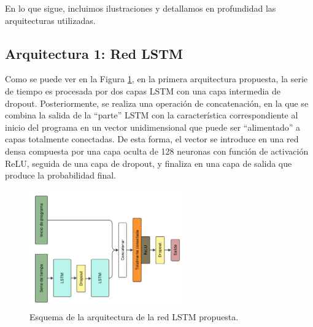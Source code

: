 \documentclass[../../main.tex]{subfiles}
\begin{document}
En lo que sigue, incluimos ilustraciones y detallamos en profundidad las arquitecturas
utilizadas.

\subsection{Arquitectura 1: Red LSTM}
Como se puede ver en la Figura \ref{fig:lstm_v2}, en la primera arquitectura propuesta, la
serie de tiempo es procesada por dos capas LSTM con una capa intermedia de dropout.
Posteriormente, se realiza una operación de concatenación, en la que se combina la salida
de la ``parte'' LSTM con la característica correspondiente al inicio del programa en un
vector unidimensional que puede ser ``alimentado'' a capas totalmente conectadas. De esta
forma, el vector se introduce en una red densa compuesta por una capa oculta de 128
neuronas con función de activación ReLU, seguida de una capa de dropout, y finaliza en una
capa de salida que produce la probabilidad final.
\begin{figure}[ht]
    \centering
    \includegraphics[width=0.6\textwidth]{figs/lstm_v2.png}
    \caption{Esquema de la arquitectura de la red LSTM propuesta.}
    \label{fig:lstm_v2}
\end{figure}
\end{document}
